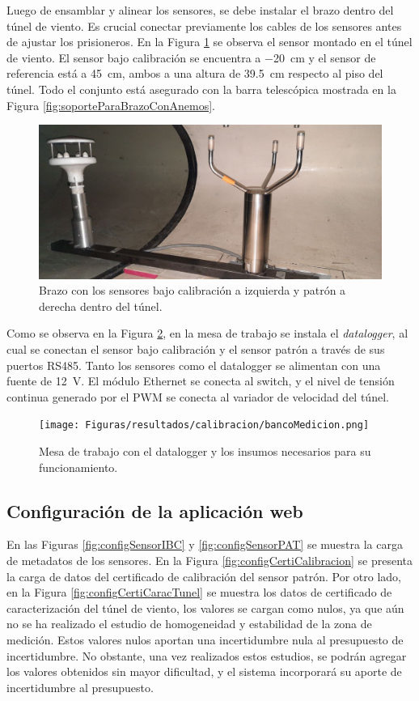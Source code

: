 Luego de ensamblar y alinear los sensores, se debe instalar el brazo dentro del túnel de viento. Es crucial conectar previamente los cables de los sensores antes de ajustar los prisioneros. En la Figura \ref{fig:deltaMontajeTunel} se observa el sensor montado en el túnel de viento. El sensor bajo calibración se encuentra a \SI{-20}{\centi\meter} y el sensor de referencia está a \SI{45}{\centi\meter}, ambos a una altura de \SI{39.5}{\centi\meter} respecto al piso del túnel. Todo el conjunto está asegurado con la barra telescópica mostrada en la Figura \ref{fig:soporteParaBrazoConAnemos}.


\begin{figure}[H]
    \centering
    \includegraphics[width=0.7\linewidth]{Figuras/resultados/calibracion/HD51_3/deltaMontajeTunel.jpg}
    \caption{Brazo con los sensores bajo calibración a izquierda y patrón a derecha dentro del túnel.}
    \label{fig:deltaMontajeTunel}
\end{figure}

Como se observa en la Figura \ref{fig:datalogger3}, en la mesa de trabajo se instala el \textit{datalogger}, al cual se conectan el sensor bajo calibración y el sensor patrón a través de sus puertos RS485. Tanto los sensores como el datalogger se alimentan con una fuente de \SI{12}{\volt}. El módulo Ethernet se conecta al switch, y el nivel de tensión continua generado por el PWM se conecta al variador de velocidad del túnel.

\begin{figure}[H]
    \centering
    \texttt{[image: Figuras/resultados/calibracion/bancoMedicion.png]}
    \caption{Mesa de trabajo con el datalogger y los insumos necesarios para su funcionamiento.}
    \label{fig:datalogger3}
\end{figure}

\subsection{Configuración de la aplicación web}

En las Figuras \ref{fig:configSensorIBC} y \ref{fig:configSensorPAT} se muestra la carga de metadatos de los sensores. En la Figura \ref{fig:configCertiCalibracion} se presenta la carga de datos del certificado de calibración del sensor patrón. Por otro lado, en la Figura \ref{fig:configCertiCaracTunel} se muestra los datos de certificado de caracterización del túnel de viento, los valores se cargan como nulos, ya que aún no se ha realizado el estudio de homogeneidad y estabilidad de la zona de medición. Estos valores nulos aportan una incertidumbre nula al presupuesto de incertidumbre. No obstante, una vez realizados estos estudios, se podrán agregar los valores obtenidos sin mayor dificultad, y el sistema incorporará su aporte de incertidumbre al presupuesto.


